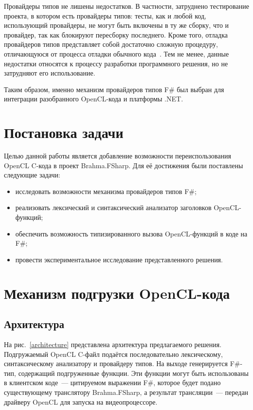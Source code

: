 Провайдеры типов не лишены недостатков. В частности, затруднено тестирование проекта, в котором есть провайдеры типов: тесты, как и любой код, использующий провайдеры, не могут быть включены в ту же сборку, что и провайдер, так как блокируют пересборку последнего. Кроме того, отладка провайдеров типов представляет собой достаточно сложную процедуру, отличающуюся от процесса отладки обычного кода~\cite{TypeProvidersTips}. Тем не менее, данные недостатки относятся к процессу разработки программного решения, но не затрудняют его использование.

Таким образом, именно механизм провайдеров типов F\# был выбран для интеграции разобранного OpenCL-кода и платформы .NET.

\section{Постановка задачи}

Целью данной работы является добавление возможности переиспользования OpenCL C-кода в проект Brahma.FSharp. Для её достижения были поставлены следующие задачи:

\begin{itemize}
    \item исследовать возможности механизма провайдеров типов F\#;
    \item реализовать лексический и синтаксический анализатор заголовков OpenCL-функций;
    \item обеспечить возможность типизированного вызова OpenCL-функций в коде на F\#;
    \item провести экспериментальное исследование представленного решения.
\end{itemize}


\section{Механизм подгрузки OpenCL-кода}

\subsection{Архитектура}
На рис.~\ref{architecture} представлена архитектура предлагаемого решения. Подгружаемый OpenCL C-файл подаётся последовательно лексическому, синтаксическому анализатору и провайдеру типов. На выходе генерируется F\#-тип, содержащий подгруженные функции. Эти функции могут быть использованы в клиентском коде~--- цитируемом выражении F\#, которое будет подано существующему транслятору Brahma.FSharp, а результат трансляции~--- передан драйверу OpenCL для запуска на видеопроцессоре.

